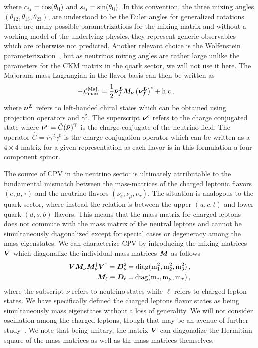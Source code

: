 where $c_{ij} = \rm{cos}(\theta_{ij})$ and $s_{ij} = \rm{sin}(\theta_{ij})$. In this convention, the three mixing angles $(\theta_{12}, \theta_{13}, \theta_{23})$, are understood to be the Euler angles for generalized rotations. There are many possible parametrizations for the mixing matrix and without a working model of the underlying physics, they represent generic observables which are otherwise not predicted. Another relevant choice is the Wolfenstein parameterization~\citep{wolfenstein1983parametrization}, but as neutrinos mixing angles are rather large unlike the parameters for the CKM matrix in the quark sector, we will not use it here. The Majorana mass Lagrangian in the flavor basis can then be written as
\begin{alignat}{1}
	\label{mass:1} -\mathcal{L}_{\rm{mass}}^{\rm{Maj.}}&=\frac{1}{2}\boldsymbol{\bar{\nu}_{f}^{L}}\boldsymbol{M}_{\nu}\left(\boldsymbol{\nu_{f}^{L}}\right)^{c}+\rm{h.c}\,,
\end{alignat}
where $\boldsymbol{\nu^{L}}$ refers to left-handed chiral states which can be obtained using projection operators and $\gamma^{5}$. The superscript $\boldsymbol{\nu}^{c}$ refers to the charge conjugated state where $\boldsymbol{\nu}^{c} = \hat{C}(\boldsymbol{\bar{\nu}})^{\rm T}$ is the charge conjugate of the neutrino field. The operator $\hat{C} = i\gamma^{2}\gamma^{0}$ is the charge conjugation operator which can be written as a $4\times4$ matrix for a given representation as each flavor is in this formulation a four-component spinor.

The source of CPV in the neutrino sector is ultimately attributable to the fundamental mismatch between the mass-matrices of the charged leptonic flavors $(e,\mu,\tau)$ and the neutrino flavors $(\nu_{e},\nu_{\mu},\nu_{\tau})$. The situation is analogous to the quark sector, where instead the relation is between the upper $(u,c,t)$ and lower quark $(d,s,b)$ flavors. This means that the mass matrix for charged leptons does not commute with the mass matrix of the neutral leptons and cannot be simultaneously diagonalized except for special cases or degeneracy among the mass eigenstates. We can characterize CPV by introducing the mixing matrices $\boldsymbol{V}$ which diagonalize the individual mass-matrices $\boldsymbol{M}$ as follows
\begin{alignat}{1}
	\label{diag:1} \boldsymbol{V}\boldsymbol{M}_{\nu}\boldsymbol{M}_{\nu}^{\dagger}\boldsymbol{V}^{\dagger} = \boldsymbol{D}_{\nu}^{2} = \rm{diag}(m_{1}^{2},m_{2}^{2},m_{3}^{2})\,,\\
    \label{diag:2} \boldsymbol{M}_{\ell} \equiv \boldsymbol{D}_{\ell} = \rm{diag}(m_{e},m_{\mu},m_{\tau})\,,
\end{alignat}
where the subscript $\nu$ refers to neutrino states while $\ell$ refers to charged lepton states. We have specifically defined the charged leptons flavor states as being simultaneously mass eigenstates without a loss of generality. We will not consider oscillation among the charged leptons, though that may be an avenue of further study~\citep{akhmedov2007charged}. We note that being unitary, the matrix $\boldsymbol{V}$ can diagonalize the Hermitian square of the mass matrices as well as the mass matrices themselves.

